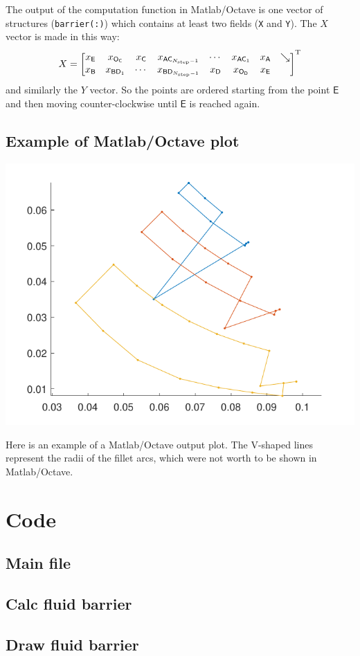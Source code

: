 \documentclass[b5paper,11pt,oneside,fleqn]{article}
\newcommand{\ap}[1]{^\textup{#1}}
\newcommand{\pt}[1]{\mathsf{#1}}
\newcommand{\Nstep}{N_{\textup{step}}}
\begin{document}
The output of the computation function in Matlab/Octave is one vector of 
structures (\texttt{barrier(:)}) which contains at least two fields (\texttt{X} 
and \texttt{Y}).
%
The $ X $ vector is made in this way:
\[
X = 
\begin{bmatrix}
x_\pt{E} &
x_{\pt{O}_{\pt{C}}} & 
x_\pt{C} &
%
x_{\pt{AC}_{\Nstep-1}} &
\cdots &
x_{\pt{AC}_1} &
x_\pt{A} &
\searrow \\
%
x_\pt{B} & 
x_{\pt{BD}_1} &
\cdots &
x_{\pt{BD}_{\Nstep-1}} &
%
x_\pt{D} &
x_{\pt{O}_{\pt{D}}} & 
x_\pt{E} 
\end{bmatrix}\ap{T}
\]
and similarly the $ Y $ vector. So the points are ordered starting from the 
point $ \pt{E} $ and then moving counter-clockwise until $ \pt{E} $ is reached 
again.





\subsection{Example of Matlab/Octave plot}

\includegraphics[width=0.75\linewidth]{gfx/MatlabOutput}

Here is an example of a Matlab/Octave output plot.
The V-shaped lines represent the radii of the fillet arcs, which were not worth 
to be shown in Matlab/Octave.




\clearpage
\section{Code}

\subsection{Main file}

\clearpage

\subsection{Calc fluid barrier}

\clearpage

\subsection{Draw fluid barrier}

\end{document}
